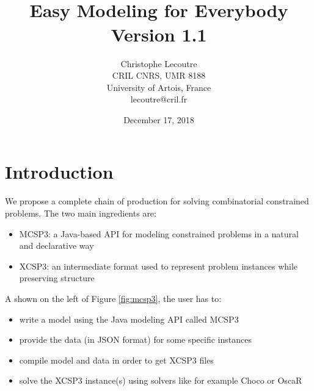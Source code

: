 \documentclass[10pt]{article}
\title{\textcolor{dred}{\mt \\ Easy Modeling for Everybody}\\ \textcolor{dred}{{\large Version 1.1}}}
\author{Christophe Lecoutre \\
CRIL CNRS, UMR 8188\\ University of Artois, France \\
lecoutre@cril.fr
}
\date{December 17, 2018} %
\begin{document}
\maketitle

\section{Introduction}

We propose a complete chain of production for solving combinatorial constrained problems. The two main ingredients are:
\begin{itemize}
\item MCSP3: a Java-based API for modeling constrained problems in a natural and declarative way
\item XCSP3: an intermediate format used to represent problem instances while preserving structure
\end{itemize}

\noindent A shown on the left of Figure \ref{fig:mcsp3}, the user has to:
\begin{itemize}
\item write a model using the Java modeling API called MCSP3
\item provide the data (in JSON format) for some specific instances
\item compile model and data in order to get XCSP3 files
\item solve the XCSP3 instance(s) using solvers like for example Choco or OscaR
\end{itemize}
\end{document}
